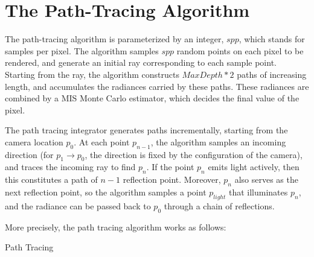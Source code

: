 \section{The Path-Tracing Algorithm}

The path-tracing algorithm is parameterized by an integer, $spp$, which stands for samples per pixel. The algorithm samples $spp$ random points on each pixel to be rendered, and generate an initial ray corresponding to each sample point. Starting from the ray, the algorithm constructs $MaxDepth*2$ paths of increasing length, and accumulates the radiances carried by these paths. These radiances are combined by a MIS Monte Carlo estimator, which decides the final value of the pixel.

The path tracing integrator generates paths incrementally, starting from the camera location $p_0$. At each point $p_{n-1}$, the algorithm samples an incoming direction (for $p_{1}\to p_0$, the direction is fixed by the configuration of the camera), and traces the incoming ray to find $p_{n}$. If the point $p_{n}$ emits light actively, then this constitutes a path of $n-1$ reflection point. Moreover, $p_{n}$ also serves as the next reflection point, so the algorithm samples a point $p_{light}$ that illuminates $p_{n}$, and the radiance can be passed back to $p_0$ through a chain of reflections.


More precisely, the path tracing algorithm works as follows:


\begin{algorithm}[H]
    \label{Path Tracing}
    \caption{Path Tracing}
\end{algorithm}

